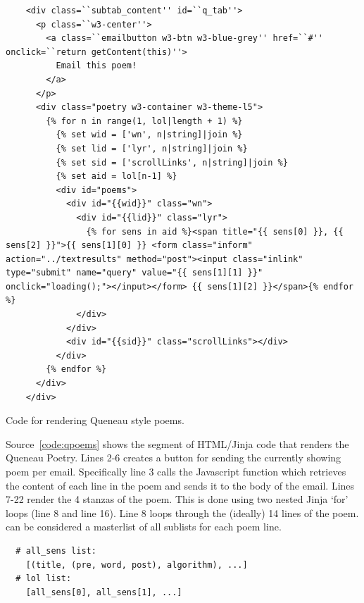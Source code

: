 \begin{listing}[h!]
  \begin{verbatim}
    <div class=``subtab_content'' id=``q_tab''>
      <p class=``w3-center''>
        <a class=``emailbutton w3-btn w3-blue-grey'' href=``#'' onclick=``return getContent(this)''>
          Email this poem!
        </a>
      </p>
      <div class="poetry w3-container w3-theme-l5">
        {% for n in range(1, lol|length + 1) %}
          {% set wid = ['wn', n|string]|join %}
          {% set lid = ['lyr', n|string]|join %}
          {% set sid = ['scrollLinks', n|string]|join %}
          {% set aid = lol[n-1] %}
          <div id="poems">
            <div id="{{wid}}" class="wn">
              <div id="{{lid}}" class="lyr">
                {% for sens in aid %}<span title="{{ sens[0] }}, {{ sens[2] }}">{{ sens[1][0] }} <form class="inform" action="../textresults" method="post"><input class="inlink" type="submit" name="query" value="{{ sens[1][1] }}" onclick="loading();"></input></form> {{ sens[1][2] }}</span>{% endfor %}
              </div>
            </div>
            <div id="{{sid}}" class="scrollLinks"></div>
          </div>
        {% endfor %}
      </div>
    </div>
  \end{verbatim}
\caption{Code for rendering Queneau style poems.}
\label{code:qpoems}
\end{listing}

Source~\ref{code:qpoems} shows the segment of HTML/Jinja code that renders the Queneau Poetry. Lines 2-6 creates a button for sending the currently showing poem per email. Specifically line 3 calls the Javascript function  which retrieves the content of each line in the poem and sends it to the body of the email. Lines 7-22 render the 4 stanzas of the poem. This is done using two nested Jinja `for' loops (line 8 and line 16). Line 8 loops through the (ideally) 14 lines of the poem.  can be considered a masterlist of all sublists for each poem line.


\begin{verbatim}
  # all_sens list:
    [(title, (pre, word, post), algorithm), ...]
  # lol list:
    [all_sens[0], all_sens[1], ...]
\end{verbatim}


